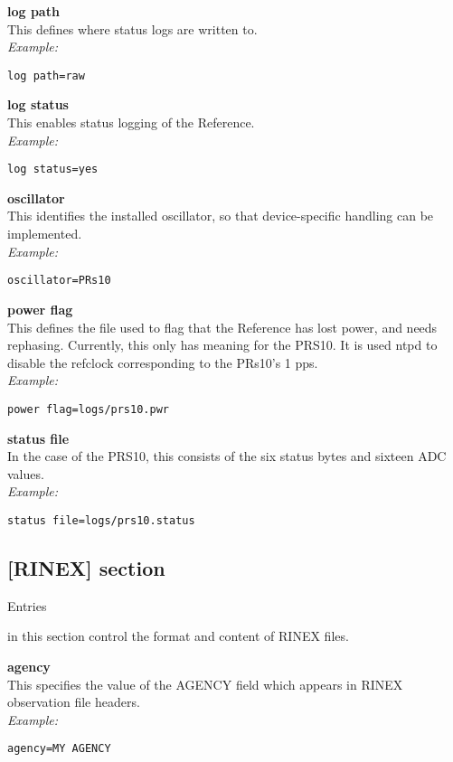 {\bfseries log path}\\
This defines where status logs are written to.\\
\textit{Example:}
\begin{lstlisting}
log path=raw
\end{lstlisting}

{\bfseries log status}\\
This enables status logging of the Reference.\\
\textit{Example:}
\begin{lstlisting}
log status=yes
\end{lstlisting}

{\bfseries oscillator}\\
This identifies the installed oscillator, so that device-specific handling can be implemented.\\
\textit{Example:}
\begin{lstlisting}
oscillator=PRs10
\end{lstlisting}

{\bfseries power flag}\\
This defines the file used to flag that the Reference has lost power, and needs rephasing.
Currently, this only has meaning for the PRS10. It is used ntpd to disable the refclock
corresponding to the PRs10's 1 pps.\\
\textit{Example:}
\begin{lstlisting}
power flag=logs/prs10.pwr
\end{lstlisting}

{\bfseries status file}\\
In the case of the PRS10, this consists of the six status bytes and sixteen ADC values.\\
\textit{Example:}
\begin{lstlisting}
status file=logs/prs10.status
\end{lstlisting}


\subsection{[RINEX] section}

\hypertarget{h:rinex}{Entries} in this section control the format and content of RINEX files.

{\bfseries agency}\\
This specifies the value of the AGENCY field which appears in RINEX observation file headers.\\
\textit{Example:}
\begin{lstlisting}
agency=MY AGENCY
\end{lstlisting}

